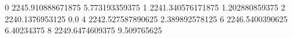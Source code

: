 0 2245.910888671875 5.773193359375
1 2241.340576171875 1.202880859375
2 2240.1376953125 0.0
4 2242.527587890625 2.389892578125
6 2246.5400390625 6.40234375
8 2249.6474609375 9.509765625
